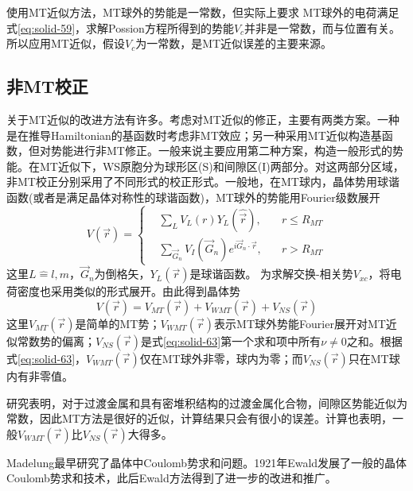 使用MT近似方法，MT球外的势能是一常数，但实际上要求%
MT球外的电荷满足式\eqref{eq:solid-59}，求解Possion方程所得到的势能$V_c$并非是一常数，而与位置有关。所以应用MT近似，假设$V_c$为一常数，是MT近似误差的主要来源。

\subsection{非MT校正}
关于MT近似的改进方法有许多\cite{RPP44-139_1981}。考虑对MT近似的修正，主要有两类方案。一种是在推导Hamiltonian的基函数时考虑非MT效应；另一种采用MT近似构造基函数，但对势能进行非MT修正。一般来说主要应用第二种方案，构造一般形式的势能。在MT近似下，WS原胞分为球形区(S)和间隙区(I)两部分。对这两部分区域，非MT校正分别采用了不同形式的校正形式。一般地，在MT球内，晶体势用球谐函数(或者是满足晶体对称性的球谐函数)，MT球外的势能用Fourier级数展开\cite{PRB13-5362_1976}
\begin{equation}
  V(\vec r)=\left\{
  \begin{aligned}
    &\sum_LV_L(r)Y_L(\hat{\vec r}),\quad &r\leqslant R_{MT}\\
    &\sum_{\vec G_n}V_I(\vec G_n)e^{i\vec G_n\cdot\vec r},&r>R_{MT}
  \end{aligned}\right.
  \label{eq:solid-63}
\end{equation}
这里$L\hat=l,m$，$\vec G_n$为倒格矢，$Y_L(\vec r)$是球谐函数。%
为求解交换-相关势$V_{xc}$，将电荷密度也采用类似的形式展开。由此得到晶体势
\begin{equation}
  V(\vec r)=V_{MT}(\vec r)+V_{WMT}(\vec r)+V_{NS}(\vec r)
  \label{eq:solid-64}
\end{equation}
这里$V_{MT}(\vec r)$是简单的MT势；$V_{WMT}(\vec r)$表示MT球外势能Fourier展开对MT近似常数势的偏离；$V_{NS}(\vec r)$是式\eqref{eq:solid-63}第一个求和项中所有$\nu$$\neq$0之和。根据式\eqref{eq:solid-63}，$V_{WMT}(\vec r)$仅在MT球外非零，球内为零；而$V_{NS}(\vec r)$只在MT球内有非零值。

研究表明，对于过渡金属和具有密堆积结构的过渡金属化合物，间隙区势能近似为常数，因此MT方法是很好的近似，计算结果只会有很小的误差\cite{PR153-931_1967,PRB1-1318_1970,PLA33-414_1970}。计算也表明，一般$V_{WMT}(\vec r)$比$V_{NS}(\vec r)$大得多。

Madelung\cite{PZ19-524_1918}最早研究了晶体中Coulomb势求和问题。1921年Ewald\cite{AP64-253_1921}发展了一般的晶体Coulomb势求和技术，此后Ewald方法得到了进一步的改进和推广\cite{Tosi,PR117-1466_1960,PR181-1020_1969}。

